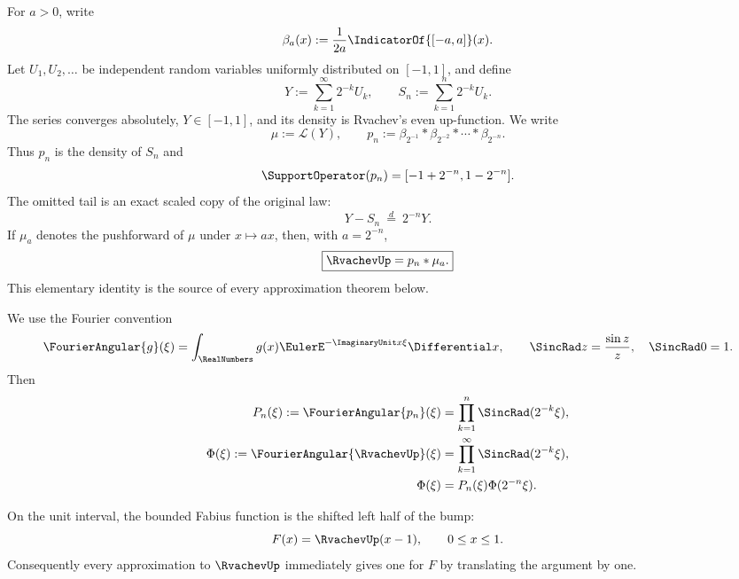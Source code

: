 \documentclass[11pt]{article}
\numberwithin{equation}{section}
\theoremstyle{definition}
\theoremstyle{remark}
\begin{document}
For $a>0$, write
\begin{equation}
 \beta_a(x):=\frac1{2a}\IndicatorOf{[-a,a]}(x).
 \label{p1:eq:box}
\end{equation}
Let $U_1,U_2,\ldots$ be independent random variables uniformly distributed on $[-1,1]$, and define
\begin{equation}
 Y:=\sum_{k=1}^{\infty}2^{-k}U_k,
 \qquad
 S_n:=\sum_{k=1}^{n}2^{-k}U_k.
 \label{p1:eq:Y-Sn}
\end{equation}
The series converges absolutely, $Y\in[-1,1]$, and its density is Rvachev's even up-function.  We write
\begin{equation}
 \mu:=\mathcal L(Y),
 \qquad
 p_n:=\beta_{2^{-1}}*\beta_{2^{-2}}*\cdots*\beta_{2^{-n}}.
 \label{p1:eq:mu-pn}
\end{equation}
Thus $p_n$ is the density of $S_n$ and
\begin{equation}
 \SupportOperator(p_n)=[-1+2^{-n},1-2^{-n}].
 \label{p1:eq:pn-support}
\end{equation}
The omitted tail is an exact scaled copy of the original law:
\begin{equation}
 Y-S_n\ \stackrel{d}=\ 2^{-n}Y.
 \label{p1:eq:tail-self-similar}
\end{equation}
If $\mu_a$ denotes the pushforward of $\mu$ under $x\mapsto ax$, then, with $a=2^{-n}$,
\begin{equation}
 \boxed{\RvachevUp=p_n*\mu_a.}
 \label{p1:eq:master-tail-factorization}
\end{equation}
This elementary identity is the source of every approximation theorem below.

We use the Fourier convention
\begin{equation}
 \FourierAngular{g}(\xi)=\int_{\RealNumbers}g(x)\EulerE^{-\ImaginaryUnit x\xi}\Differential x,
 \qquad
 \SincRad z=\frac{\sin z}{z},\quad \SincRad0=1.
 \label{p1:eq:Fourier-convention}
\end{equation}
Then
\begin{align}
 P_n(\xi):=\FourierAngular{p_n}(\xi)
  &=\prod_{k=1}^{n}\SincRad(2^{-k}\xi),\label{p1:eq:Pn}\\
 \Phi(\xi):=\FourierAngular{\RvachevUp}(\xi)
  &=\prod_{k=1}^{\infty}\SincRad(2^{-k}\xi),\label{p1:eq:Phi}\\
 \Phi(\xi)&=P_n(\xi)\Phi(2^{-n}\xi).\label{p1:eq:Phi-factor}
\end{align}

On the unit interval, the bounded Fabius function is the shifted left half of the bump:
\begin{equation}
 F(x)=\RvachevUp(x-1),\qquad 0\le x\le1.
 \label{p1:eq:F-shift}
\end{equation}
Consequently every approximation to $\RvachevUp$ immediately gives one for $F$ by translating the argument by one.
\end{document}
